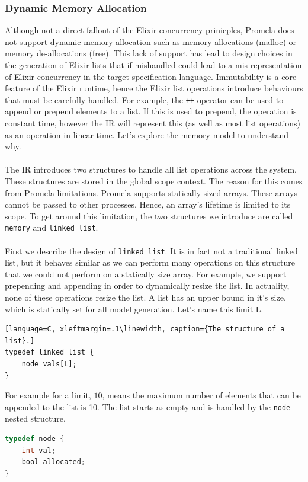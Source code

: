 \subsubsection{Dynamic Memory Allocation}
Although not a direct fallout of the Elixir concurrency prinicples, Promela does not support dynamic memory allocation such as memory allocations (malloc) or memory de-allocations (free). This lack of support has lead to design choices in the generation of Elixir lists that if mishandled could lead to a mis-representation of Elixir concurrency in the target specification language. Immutability is a core feature of the Elixir runtime, hence the Elixir list operations introduce behaviours that must be carefully handled. For example, the \texttt{++} operator can be used to append or prepend elements to a list. If this is used to prepend, the operation is constant time, however the IR will represent this (as well as most list operations) as an operation in linear time. Let's explore the memory model to understand why. 
\\ \\
The IR introduces two structures to handle all list operations across the system. These structures are stored in the global scope context. The reason for this comes from Promela limitations. Promela supports statically sized arrays. These arrays cannot be passed to other processes. Hence, an array's lifetime is limited to its scope. To get around this limitation, the two structures we introduce are called \texttt{memory} and \texttt{linked\_list}.
\\ \\
First we describe the design of \texttt{linked\_list}. It is in fact not a traditional linked list, but it behaves similar as we can perform many operations on this structure that we could not perform on a statically size array. For example, we support prepending and appending in order to dynamically resize the list. In actuality, none of these operations resize the list. A list has an upper bound in it's size, which is statically set for all model generation. Let's name this limit L.
\begin{lstlisting}[language=C, xleftmargin=.1\linewidth, caption={The structure of a list}.]
typedef linked_list {
    node vals[L];
}
\end{lstlisting}
For example for a limit, $10$, means the maximum number of elements that can be appended to the list is 10. The list starts as empty and is handled by the \texttt{node} nested structure.
\begin{lstlisting}[language=C, xleftmargin=.1\linewidth, caption={Example of a list node typed `int'.}]
typedef node {
    int val;
    bool allocated;
}
\end{lstlisting}
